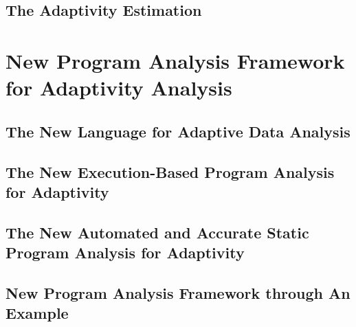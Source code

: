 \documentclass[a4paper,11pt]{article}
\begin{document}
\subsection{The Adaptivity Estimation}
\label{sec:prework-static}


\section{New Program Analysis Framework for Adaptivity Analysis }
\label{sec:adapt-analysis}
% 

\subsection{The New Language for Adaptive Data Analysis}
\label{sec:adapt-language}



\subsection{The New Execution-Based Program Analysis for Adaptivity}
\label{sec:adapt-exe}

% 

\subsection{The New Automated and Accurate Static Program Analysis for Adaptivity}
\label{sec:adapt-static}


\subsection{New Program Analysis Framework through An Example}
\label{sec:adapt-example}


\section*{}
%
\end{document}
